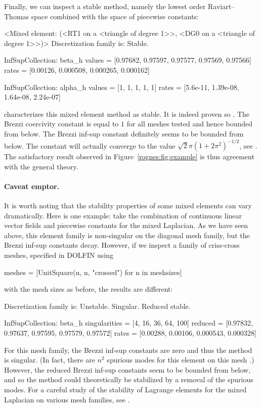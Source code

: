 Finally, we can inspect a stable method, namely the lowest order
Raviart--Thomas space combined with the space of piecewise constants:
\begin{python}
<Mixed element: (<RT1 on a <triangle of degree 1>>,
<DG0 on a <triangle of degree 1>>)>
Discretization family is: Stable.

InfSupCollection: beta_h
values =         [0.97682, 0.97597, 0.97577, 0.97569, 0.97566]
rates  =         [0.00126, 0.000508, 0.000265, 0.000162]

InfSupCollection: alpha_h
values =         [1, 1, 1, 1, 1]
rates  =         [5.6e-11, 1.39e-08, 1.64e-08, 2.24e-07]
\end{python}
\rognesascot{} characterizes this mixed element method as stable. It
is indeed proven so \citep{RaviartThomas1977}. The Brezzi coercivity
constant is equal to $1$ for all meshes tested and hence bounded from
below. The Brezzi inf-sup constant definitely seems to be bounded from
below. The constant will actually converge to the value $\sqrt{2} \pi
(1 + 2 \pi^2)^{-1/2}$, see \citep{ArnoldRognes2009}.  The satisfactory
result observed in
Figure~\ref{rognes:fig:example} is thus
agreement with the general theory.

\paragraph*{Caveat emptor.}

It is worth noting that the stability properties of some mixed
elements can vary dramatically. Here is one example: take the
combination of continuous linear vector fields and piecewise constants
for the mixed Laplacian. As we have seen above, this element family is
non-singular on the diagonal mesh family, but the Brezzi inf-sup
constants decay. However, if we inspect a family of criss-cross
meshes, specified in DOLFIN using
\begin{python}
meshes = [UnitSquare(n, n, "crossed") for n in meshsizes]
\end{python}
with the mesh sizes as before, the results are different:
\begin{python}
Discretization family is: Unstable. Singular. Reduced stable.

InfSupCollection: beta_h
singularities = [4, 16, 36, 64, 100]
reduced =        [0.97832, 0.97637, 0.97595, 0.97579, 0.97572]
rates  =         [0.00288, 0.00106, 0.000543, 0.000328]
\end{python}
For this mesh family, the Brezzi inf-sup constants are zero and thus
the method is singular. (In fact, there are $n^2$ spurious modes for
this element on this mesh \citep{Qin1994}.) However, the reduced
Brezzi inf-sup constants seem to be bounded from below, and so the
method could theoretically be stabilized by a removal of the spurious
modes. For a careful study of the stability of Lagrange elements for
the mixed Laplacian on various mesh families,
see \citet{ArnoldRognes2009}.

